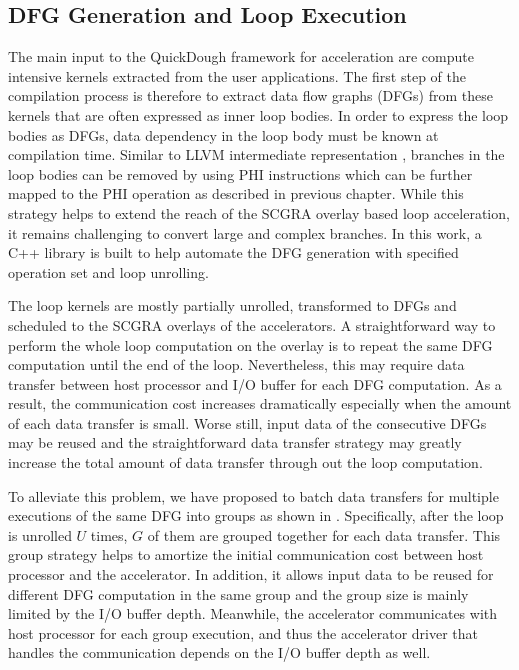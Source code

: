 \subsection{DFG Generation and Loop Execution}
The main input to the QuickDough framework for acceleration are compute intensive kernels extracted from the user applications. The first step of the compilation process is therefore to extract data flow graphs (DFGs) from these kernels that are often expressed as inner loop bodies. In order to express the loop bodies as DFGs, data dependency in the loop body must be known at compilation time. Similar to LLVM intermediate representation \cite{llvm}, branches in the loop bodies can be removed by using PHI instructions which can be further mapped to the PHI operation as described in previous chapter. While this strategy helps to extend the reach of the SCGRA overlay based loop acceleration, it remains challenging to convert large and complex branches. In this work, a C++ library is built to help automate the DFG generation with specified operation set and loop unrolling.

The loop kernels are mostly partially unrolled, transformed to DFGs and scheduled to the SCGRA overlays of the accelerators. A straightforward way to perform the whole loop computation on the overlay is to repeat the same DFG computation until the end of the loop. Nevertheless, this may require data transfer between host processor and I/O buffer for each DFG computation. As a result, the communication cost increases dramatically especially when the amount of each data transfer is small. Worse still, input data of the consecutive DFGs may be reused and the straightforward data transfer strategy may greatly increase the total amount of data transfer through out the loop computation. 

To alleviate this problem, we have proposed to batch data transfers for multiple executions of the same DFG into groups as shown in . Specifically, after the loop is unrolled $U$ times, $G$ of them are grouped together for each data transfer. This group strategy helps to amortize the initial communication cost between host processor and the accelerator. In addition, it allows input data to be reused for different DFG computation in the same group and the group size is mainly limited by the I/O buffer depth. Meanwhile, the accelerator communicates with host processor for each group execution, and thus the accelerator driver that handles the communication depends on the I/O buffer depth as well. 

